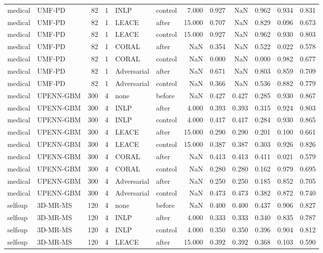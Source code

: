 \begin{tabular}{llrrllrrrrrr}
medical & UMF-PD & 82 & 1 & INLP & control & 7.000 & 0.927 & NaN & 0.962 & 0.934 & 0.831 \\
medical & UMF-PD & 82 & 1 & LEACE & after & 15.000 & 0.707 & NaN & 0.829 & 0.096 & 0.673 \\
medical & UMF-PD & 82 & 1 & LEACE & control & 15.000 & 0.927 & NaN & 0.962 & 0.930 & 0.803 \\
medical & UMF-PD & 82 & 1 & CORAL & after & NaN & 0.354 & NaN & 0.522 & 0.022 & 0.578 \\
medical & UMF-PD & 82 & 1 & CORAL & control & NaN & 0.000 & NaN & 0.000 & 0.982 & 0.677 \\
medical & UMF-PD & 82 & 1 & Adversarial & after & NaN & 0.671 & NaN & 0.803 & 0.859 & 0.709 \\
medical & UMF-PD & 82 & 1 & Adversarial & control & NaN & 0.366 & NaN & 0.536 & 0.882 & 0.779 \\
medical & UPENN-GBM & 300 & 4 & none & before & NaN & 0.427 & 0.427 & 0.285 & 0.930 & 0.867 \\
medical & UPENN-GBM & 300 & 4 & INLP & after & 4.000 & 0.393 & 0.393 & 0.315 & 0.924 & 0.803 \\
medical & UPENN-GBM & 300 & 4 & INLP & control & 4.000 & 0.417 & 0.417 & 0.284 & 0.930 & 0.865 \\
medical & UPENN-GBM & 300 & 4 & LEACE & after & 15.000 & 0.290 & 0.290 & 0.201 & 0.100 & 0.661 \\
medical & UPENN-GBM & 300 & 4 & LEACE & control & 15.000 & 0.387 & 0.387 & 0.303 & 0.926 & 0.826 \\
medical & UPENN-GBM & 300 & 4 & CORAL & after & NaN & 0.413 & 0.413 & 0.411 & 0.021 & 0.579 \\
medical & UPENN-GBM & 300 & 4 & CORAL & control & NaN & 0.280 & 0.280 & 0.162 & 0.979 & 0.695 \\
medical & UPENN-GBM & 300 & 4 & Adversarial & after & NaN & 0.250 & 0.250 & 0.185 & 0.852 & 0.705 \\
medical & UPENN-GBM & 300 & 4 & Adversarial & control & NaN & 0.473 & 0.473 & 0.382 & 0.872 & 0.740 \\
selfsup & 3D-MR-MS & 120 & 4 & none & before & NaN & 0.400 & 0.400 & 0.437 & 0.906 & 0.827 \\
selfsup & 3D-MR-MS & 120 & 4 & INLP & after & 4.000 & 0.333 & 0.333 & 0.340 & 0.835 & 0.787 \\
selfsup & 3D-MR-MS & 120 & 4 & INLP & control & 4.000 & 0.350 & 0.350 & 0.396 & 0.904 & 0.812 \\
selfsup & 3D-MR-MS & 120 & 4 & LEACE & after & 15.000 & 0.392 & 0.392 & 0.368 & 0.103 & 0.590 \\

\end{tabular}
